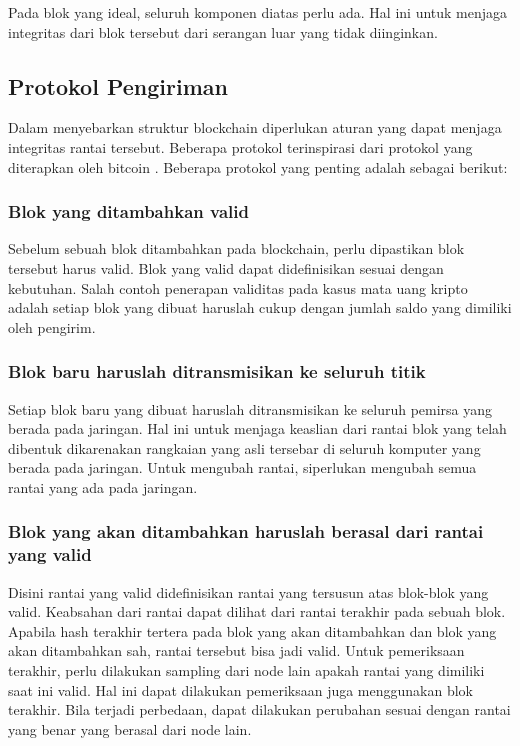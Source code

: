 \documentclass[10pt,conference]{IEEEtran}
\theoremstyle{definition}
\begin{document}
    
Pada blok yang ideal, seluruh komponen diatas perlu ada. Hal ini untuk menjaga integritas dari blok tersebut dari serangan luar yang tidak diinginkan.

\subsection{Protokol Pengiriman}
Dalam menyebarkan struktur blockchain diperlukan aturan yang dapat menjaga integritas rantai tersebut. Beberapa protokol terinspirasi dari protokol yang diterapkan oleh bitcoin \cite{a2}. Beberapa protokol yang penting adalah sebagai berikut:

\subsubsection{Blok yang ditambahkan valid}
Sebelum sebuah blok ditambahkan pada blockchain, perlu dipastikan blok tersebut harus valid. Blok yang valid dapat didefinisikan sesuai dengan kebutuhan. Salah contoh penerapan validitas pada kasus mata uang kripto adalah setiap blok yang dibuat haruslah cukup dengan jumlah saldo yang dimiliki oleh pengirim.

\subsubsection{Blok baru haruslah ditransmisikan ke seluruh titik}
Setiap blok baru yang dibuat haruslah ditransmisikan ke seluruh pemirsa yang berada pada jaringan. Hal ini untuk menjaga keaslian dari rantai blok yang telah dibentuk dikarenakan rangkaian yang asli tersebar di seluruh komputer  yang berada pada jaringan. Untuk mengubah rantai, siperlukan mengubah semua rantai yang ada pada jaringan.

\subsubsection{Blok yang akan ditambahkan haruslah berasal dari rantai yang valid}
Disini rantai yang valid didefinisikan rantai yang tersusun atas blok-blok yang valid. Keabsahan dari rantai dapat dilihat dari rantai terakhir pada sebuah blok. Apabila hash terakhir tertera pada blok yang akan ditambahkan dan blok yang akan ditambahkan sah, rantai tersebut bisa jadi valid. Untuk pemeriksaan terakhir, perlu dilakukan sampling dari node lain apakah rantai yang dimiliki saat ini valid. Hal ini dapat dilakukan pemeriksaan juga menggunakan blok  terakhir. Bila terjadi perbedaan, dapat dilakukan perubahan sesuai dengan rantai yang benar yang berasal dari node lain.
\end{document}
